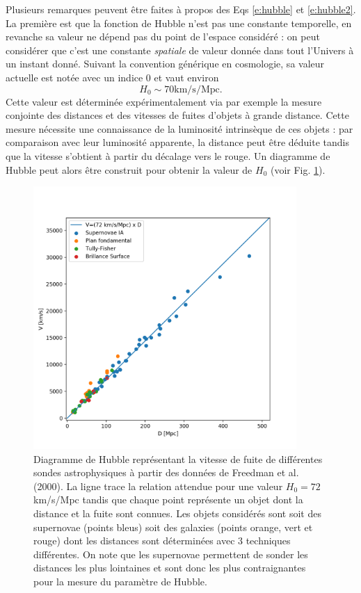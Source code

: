 Plusieurs remarques peuvent être faites à propos des Eqs \ref{e:hubble} et \ref{e:hubble2}.  La première est que la fonction de Hubble n'est pas une constante temporelle, en revanche sa valeur ne dépend pas du point de l'espace considéré : on peut considérer que c'est une constante \textit{spatiale} de valeur donnée dans tout l'Univers à un instant donné. Suivant la convention générique en cosmologie, sa valeur actuelle est notée avec un indice 0 et vaut environ
\begin{equation}
H_0 \sim 70 \mathrm{km/s/Mpc}.
\end{equation}
Cette valeur est déterminée expérimentalement via par exemple la mesure conjointe des distances et des vitesses de fuites d'objets à grande distance. Cette mesure nécessite une connaissance de la luminosité intrinsèque de ces objets  : par comparaison avec leur luminosité apparente, la distance peut être déduite tandis que la vitesse s'obtient à partir du décalage vers le rouge. Un diagramme de Hubble peut alors être construit pour obtenir la valeur de $H_0$ (voir Fig. \ref{f:hubblediag}).
\begin{figure}[htbp]
	\centering
		\includegraphics[height=10cm]{figs/hubble.png}
	\caption[Diagramme de Hubble]{Diagramme de Hubble représentant la vitesse de fuite de différentes sondes astrophysiques à partir des données de Freedman et al. (2000). La ligne trace la relation attendue pour une valeur $H_0=72$ km/s/Mpc tandis que chaque point représente un objet dont la distance et la fuite sont connues. Les objets considérés sont soit des supernovae (points bleus) soit des galaxies (points orange, vert et rouge) dont les distances sont déterminées avec 3 techniques différentes. On note que les supernovae permettent de sonder les distances les plus lointaines et sont donc les plus contraignantes pour la mesure du paramètre de Hubble. }
	\label{f:hubblediag}
\end{figure}

